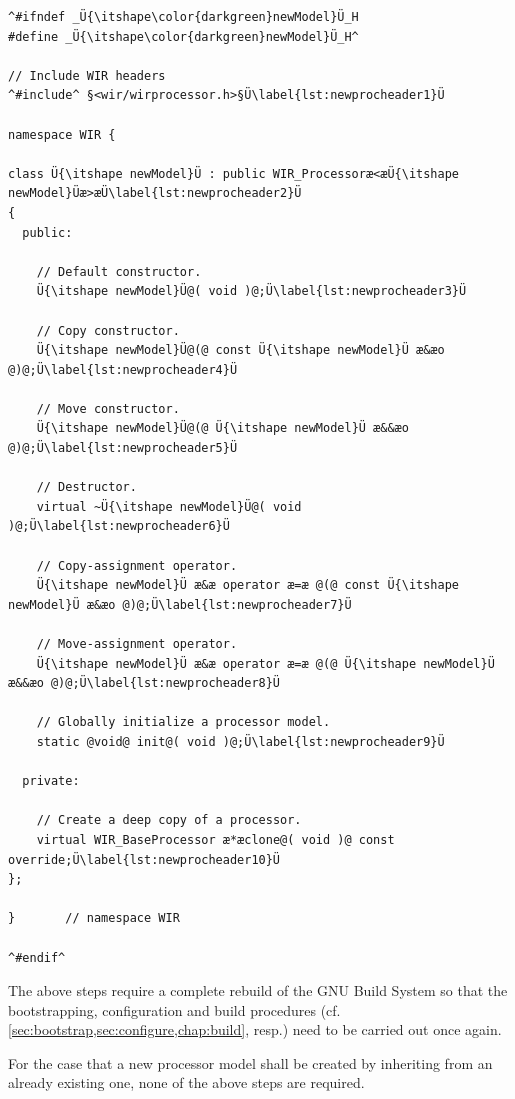\begin{lstlisting}[style=code,float=!t,caption={Rudimentary Header File for a New Processor Model's Class},label=lst:newprocheader]
^#ifndef _Ü{\itshape\color{darkgreen}newModel}Ü_H
#define _Ü{\itshape\color{darkgreen}newModel}Ü_H^

// Include WIR headers
^#include^ §<wir/wirprocessor.h>§Ü\label{lst:newprocheader1}Ü

namespace WIR {

class Ü{\itshape newModel}Ü : public WIR_Processoræ<æÜ{\itshape newModel}Üæ>æÜ\label{lst:newprocheader2}Ü
{
  public:

    // Default constructor.
    Ü{\itshape newModel}Ü@( void )@;Ü\label{lst:newprocheader3}Ü

    // Copy constructor.
    Ü{\itshape newModel}Ü@(@ const Ü{\itshape newModel}Ü æ&æo @)@;Ü\label{lst:newprocheader4}Ü

    // Move constructor.
    Ü{\itshape newModel}Ü@(@ Ü{\itshape newModel}Ü æ&&æo @)@;Ü\label{lst:newprocheader5}Ü

    // Destructor.
    virtual ~Ü{\itshape newModel}Ü@( void )@;Ü\label{lst:newprocheader6}Ü

    // Copy-assignment operator.
    Ü{\itshape newModel}Ü æ&æ operator æ=æ @(@ const Ü{\itshape newModel}Ü æ&æo @)@;Ü\label{lst:newprocheader7}Ü

    // Move-assignment operator.
    Ü{\itshape newModel}Ü æ&æ operator æ=æ @(@ Ü{\itshape newModel}Ü æ&&æo @)@;Ü\label{lst:newprocheader8}Ü

    // Globally initialize a processor model.
    static @void@ init@( void )@;Ü\label{lst:newprocheader9}Ü

  private:

    // Create a deep copy of a processor.
    virtual WIR_BaseProcessor æ*æclone@( void )@ const override;Ü\label{lst:newprocheader10}Ü
};

}       // namespace WIR

^#endif^
\end{lstlisting}

The above steps require a complete rebuild of the GNU Build System so that the bootstrapping, configuration and build procedures (cf. \cref{sec:bootstrap,sec:configure,chap:build}, resp.) need to be carried out once again.

For the case that a new processor model shall be created by inheriting from an already existing one, none of the above steps are required.

